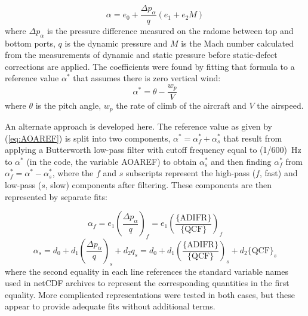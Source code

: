 \documentclass[12pt,twoside,english,12pt,twoside,english]{article}\usepackage[]{graphicx}\usepackage[]{color}
\let\OrgIndex\index
\renewcommand*{\index}[1]{\OrgIndex{#1}}
\begin{document}
\begin{equation}
\alpha=e_{0}+\frac{\Delta p_{\alpha}}{q}\left(e_{1}+e_{2}M\right)\label{eq:old-AKRD}
\end{equation}
where $\Delta p_{\alpha}$ is the pressure difference measured
on the radome between top and bottom ports,
$q$ is the dynamic pressure and $M$ is
the Mach number calculated from the measurements
of dynamic and static pressure
before static-defect corrections are applied.
The coefficients
were found by fitting that formula to
a reference
value
$\alpha^{*}$ that assumes there is zero vertical wind:\\
\begin{equation}
\alpha^{*}=\theta-\frac{w_{p}}{V}\label{eq:AOAREF}
\end{equation}
where $\theta$ is the pitch angle, $w_{p}$ the rate of climb of
the aircraft and $V$
the airspeed.

An alternate approach is developed here. The reference value as given
by (\ref{eq:AOAREF}) is split into two components, $\alpha^{*}=\alpha_{f}^{*}+\alpha_{s}^{*}$
that result from applying a Butterworth low-pass filter
with cutoff frequency equal to (1/600)~Hz to $\alpha^{*}$ (in the
code, the variable AOAREF) to obtain $\alpha_{s}^{*}$ and then finding
$\alpha_{f}^{*}$ from $\alpha_{f}^{*}=\alpha^{*}-\alpha_{s}^{*}$,
where the $f$ and $s$ subscripts represent the high-pass ($f$,
fast) and low-pass ($s$, slow) components after filtering. These
components are then represented by separate
fits:

\begin{equation}
\alpha_{f}=e_{1}\left(\frac{\Delta p_{\alpha}}{q}\right)_{f}=e_{1}\left(\frac{\mathrm{\{ADIFR\}}}{\mathrm{\{QCF\}}}\right)_{f}\label{eq:alpha-fast}
\end{equation}
\begin{equation}
\alpha_{s}=d_{0}+d_{1}\left(\frac{\Delta p_{\alpha}}{q}\right)_{s}+d_{2}q_{s}=d_{0}+d_{1}\left(\frac{\mathrm{\{ADIFR\}}}{\mathrm{\{QCF\}}}\right)_{s}+d_{2}\mathrm{\{QCF\}}_{s}\label{eq:alpha-slow}
\end{equation}
where the second equality in each line references the standard variable
names used in netCDF archives
to represent the corresponding quantities in the first equality. More
complicated representations were tested in both cases, but these appear
to provide adequate fits without additional terms.
\end{document}

